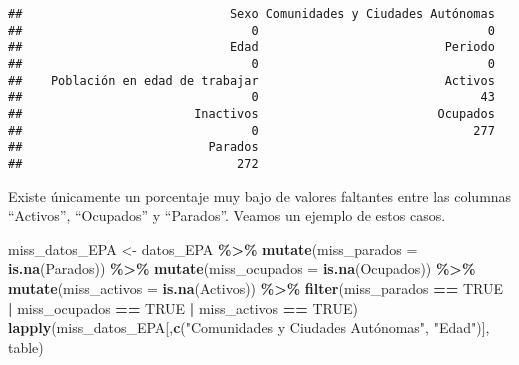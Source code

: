 \documentclass[notspecified,article,submit,moreauthors,pdftex]{Definitions/mdpi}
\newenvironment{Shaded}{\begin{snugshade}}{\end{snugshade}}
\newcommand{\AttributeTok}[1]{\textcolor[rgb]{0.13,0.29,0.53}{#1}}
\newcommand{\ConstantTok}[1]{\textcolor[rgb]{0.56,0.35,0.01}{#1}}
\newcommand{\FunctionTok}[1]{\textcolor[rgb]{0.13,0.29,0.53}{\textbf{#1}}}
\newcommand{\NormalTok}[1]{#1}
\newcommand{\OtherTok}[1]{\textcolor[rgb]{0.56,0.35,0.01}{#1}}
\newcommand{\SpecialCharTok}[1]{\textcolor[rgb]{0.81,0.36,0.00}{\textbf{#1}}}
\newcommand{\StringTok}[1]{\textcolor[rgb]{0.31,0.60,0.02}{#1}}
\begin{document}
\begin{verbatim}
##                             Sexo Comunidades y Ciudades Autónomas 
##                                0                                0 
##                             Edad                          Periodo 
##                                0                                0 
##    Población en edad de trabajar                          Activos 
##                                0                               43 
##                        Inactivos                         Ocupados 
##                                0                              277 
##                          Parados 
##                              272
\end{verbatim}

Existe únicamente un porcentaje muy bajo de valores faltantes entre las
columnas ``Activos'', ``Ocupados'' y ``Parados''. Veamos un ejemplo de
estos casos.

\begin{Shaded}
\begin{Highlighting}[]
\NormalTok{miss\_datos\_EPA }\OtherTok{\textless{}{-}}\NormalTok{ datos\_EPA }\SpecialCharTok{\%\textgreater{}\%} \FunctionTok{mutate}\NormalTok{(}\AttributeTok{miss\_parados =} \FunctionTok{is.na}\NormalTok{(Parados)) }\SpecialCharTok{\%\textgreater{}\%} 
  \FunctionTok{mutate}\NormalTok{(}\AttributeTok{miss\_ocupados =} \FunctionTok{is.na}\NormalTok{(Ocupados)) }\SpecialCharTok{\%\textgreater{}\%}
  \FunctionTok{mutate}\NormalTok{(}\AttributeTok{miss\_activos =} \FunctionTok{is.na}\NormalTok{(Activos)) }\SpecialCharTok{\%\textgreater{}\%}
  \FunctionTok{filter}\NormalTok{(miss\_parados }\SpecialCharTok{==} \ConstantTok{TRUE} \SpecialCharTok{|}\NormalTok{ miss\_ocupados }\SpecialCharTok{==} \ConstantTok{TRUE} \SpecialCharTok{|}\NormalTok{ miss\_activos }\SpecialCharTok{==} \ConstantTok{TRUE}\NormalTok{)}
\FunctionTok{lapply}\NormalTok{(miss\_datos\_EPA[,}\FunctionTok{c}\NormalTok{(}\StringTok{"Comunidades y Ciudades Autónomas"}\NormalTok{, }\StringTok{"Edad"}\NormalTok{)], table)}
\end{Highlighting}
\end{Shaded}
\end{document}
